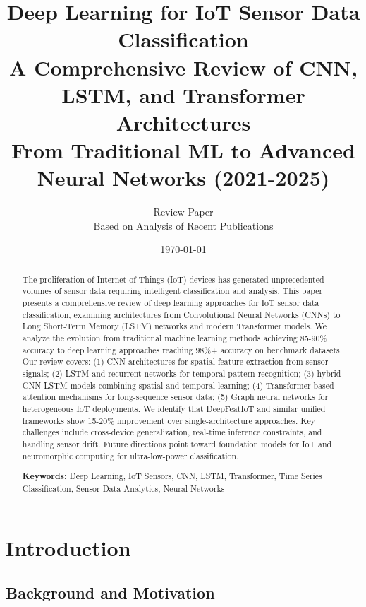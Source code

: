 \documentclass[12pt,a4paper]{article}
\title{
\vspace{-1cm}
{\Huge\bfseries Deep Learning for IoT Sensor Data Classification}\\[0.5cm]
{\Large A Comprehensive Review of CNN, LSTM, and Transformer Architectures}\\[0.3cm]
{\large From Traditional ML to Advanced Neural Networks (2021-2025)}
}
\author{
\large Review Paper\\[0.2cm]
\normalsize Based on Analysis of Recent Publications
}
\date{\today}
\begin{document}
\maketitle
\thispagestyle{empty}

\begin{abstract}
\noindent
The proliferation of Internet of Things (IoT) devices has generated unprecedented volumes of sensor data requiring intelligent classification and analysis. This paper presents a comprehensive review of deep learning approaches for IoT sensor data classification, examining architectures from Convolutional Neural Networks (CNNs) to Long Short-Term Memory (LSTM) networks and modern Transformer models. We analyze the evolution from traditional machine learning methods achieving 85-90\% accuracy to deep learning approaches reaching 98\%+ accuracy on benchmark datasets. Our review covers: (1) CNN architectures for spatial feature extraction from sensor signals; (2) LSTM and recurrent networks for temporal pattern recognition; (3) hybrid CNN-LSTM models combining spatial and temporal learning; (4) Transformer-based attention mechanisms for long-sequence sensor data; (5) Graph neural networks for heterogeneous IoT deployments. We identify that DeepFeatIoT and similar unified frameworks show 15-20\% improvement over single-architecture approaches. Key challenges include cross-device generalization, real-time inference constraints, and handling sensor drift. Future directions point toward foundation models for IoT and neuromorphic computing for ultra-low-power classification.

\vspace{0.3cm}
\noindent\textbf{Keywords:} Deep Learning, IoT Sensors, CNN, LSTM, Transformer, Time Series Classification, Sensor Data Analytics, Neural Networks
\end{abstract}

\newpage
\tableofcontents
\newpage

\section{Introduction}

\subsection{Background and Motivation}
\end{document}
